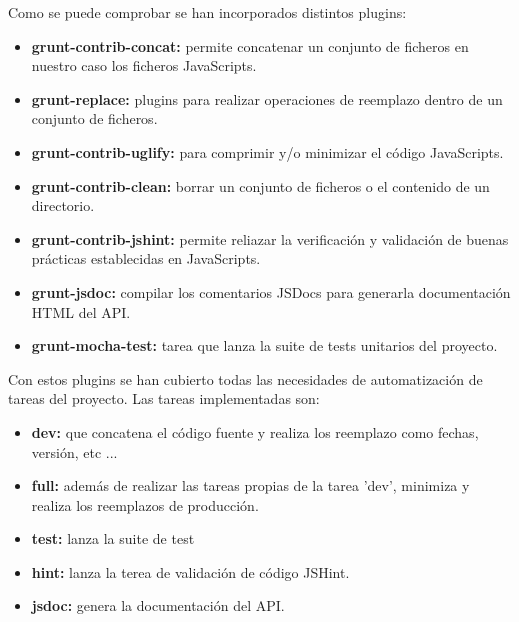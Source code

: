Como se puede comprobar se han incorporados distintos plugins:

\begin{itemize}
\item \textbf{grunt-contrib-concat:} permite concatenar un conjunto de ficheros en nuestro caso los ficheros JavaScripts.
\item \textbf{grunt-replace:} plugins para realizar operaciones de reemplazo dentro de un conjunto de ficheros.
\item \textbf{grunt-contrib-uglify:} para comprimir y/o minimizar el código JavaScripts.
\item \textbf{grunt-contrib-clean:} borrar un conjunto de ficheros o el contenido de un directorio.
\item \textbf{grunt-contrib-jshint:} permite reliazar la verificación y validación de buenas prácticas establecidas en JavaScripts.
\item \textbf{grunt-jsdoc:} compilar los comentarios JSDocs para generarla documentación HTML del API.
\item \textbf{grunt-mocha-test:} tarea que lanza la suite de tests unitarios del proyecto.
\end{itemize}

Con estos plugins se han cubierto todas las necesidades de automatización de tareas del proyecto. Las tareas implementadas son:

\begin{itemize}
\item \textbf{dev:} que concatena el código fuente y realiza los reemplazo como fechas, versión, etc ...
\item \textbf{full:} además de realizar las tareas propias de la tarea 'dev', minimiza y realiza los reemplazos de producción.
\item \textbf{test:} lanza la suite de test
\item \textbf{hint:} lanza la terea de validación de código JSHint.
\item \textbf{jsdoc:} genera la documentación del API.
\end{itemize}

